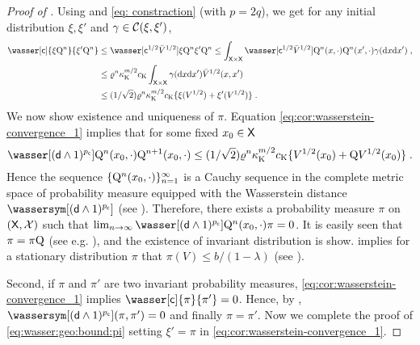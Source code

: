 \begin{proof}[Proof of ]
Using \cite[Corolllary~20.4.1]{douc:moulines:priouret:soulier:2018} and \eqref{eq: constraction} (with $p=2q$),  we get for any initial distribution $\xi, \xi'$ and $\gamma \in \mathcal{C}(\xi,\xi')$,
\begin{align}
  \nonumber
    \wasser[\cost]{\xi \MK^n}{\xi'\MK^n} &\leq \wasser[\cost^{1/2} \bar V^{1/2}]{\xi \MK^n}{\xi' \MK^n}
    \leq \int_{\Xset \times \Xset} \wasser[\cost^{1/2} \bar V^{1/2}]{\MK^n(x,\cdot)}{\MK^n(x',\cdot)}
      \gamma(\rmd x\rmd x')\eqsp, \\
    \nonumber
    &\leq \ratewas^{n}  \boundmetric^{m/2} \vartconstwas  \int_{\Xset \times \Xset} \gamma(\rmd x\rmd x') \bar{V}^{1/2}(x,x') \\
  \label{eq:cor:wasserstein-convergence_1}
    &\leq (1/\sqrt{2}) \ratewas^{n}   \boundmetric^{m/2} \vartconstwas \{ \xi(V^{1/2}) + \xi'(V^{1/2}) \} \eqsp.
\end{align}
We now show existence and uniqueness of $\pi$. Equation \eqref{eq:cor:wasserstein-convergence_1} implies that for some fixed $x_0 \in\mathsf{X}$
   \[
   \wasser[(\distance \wedge 1)^{\pcost}]{\MK^n(x_0,\cdot)}{\MK^{n+1}(x_0,\cdot)}  \leq (1/\sqrt{2}) \ratewas^{n}   \boundmetric^{m/2} \vartconstwas \{ V^{1/2}(x_0) + \MK V^{1/2}(x_0) \} \eqsp.
   \]
   Hence the sequence $\{{\rm Q}^n(x_0,\cdot)\}_{n=1}^\infty$ is a Cauchy sequence in the complete metric space of probability measure equipped with the Wasserstein distance $\wassersym[(\distance \wedge 1)^{\pcost}]$ (see \cite[Theorem~20.1.8]{douc:moulines:priouret:soulier:2018}). Therefore, there exists a probability measure $\pi$ on $(\mathsf{X},\mathcal{X})$ such that $\lim_{n \to \infty} \wasser[(\distance \wedge 1)^{\pcost}]{\MK^n(x_0,\cdot)}{\pi}=0$. It is easily seen that $\pi= \pi {\rm Q}$ (see e.g. \cite[Theorem~20.2.1]{douc:moulines:priouret:soulier:2018}), and the existence of invariant distribution is show.  implies for a stationary distribution $\pi$ that $\pi(V) \leq b / (1-\lambda)$ (see \cite[Lemma~14.1.10]{douc:moulines:priouret:soulier:2018}).
   \par
   Second, if $\pi$ and $\pi'$ are two invariant probability measures, \eqref{eq:cor:wasserstein-convergence_1} implies
$\wasser[\cost]{\pi}{\pi'}=0$. Hence, by , $\wassersym[(\distance \wedge 1)^{\pcost}](\pi,\pi')=0$ and finally $\pi=\pi'$. Now we complete the proof of \eqref{eq:wasser:geo:bound:pi} setting $\xi' = \pi$ in \eqref{eq:cor:wasserstein-convergence_1}.
\end{proof}




